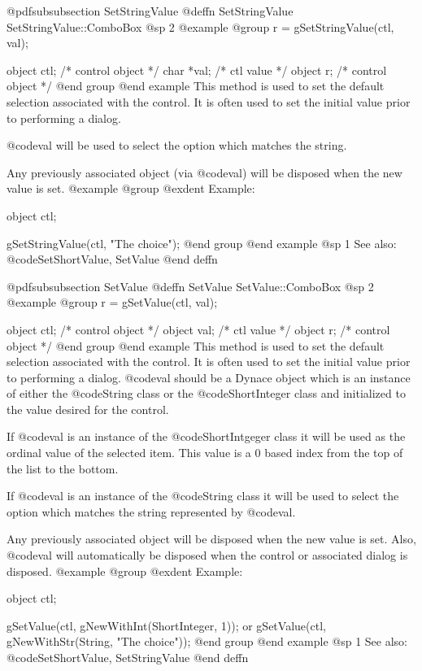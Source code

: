 @pdfsubsubsection {SetStringValue}
@deffn {SetStringValue} SetStringValue::ComboBox
@sp 2
@example
@group
r = gSetStringValue(ctl, val);

object  ctl;    /*  control object  */
char    *val;   /*  ctl value       */
object  r;      /*  control object  */
@end group
@end example
This method is used to set the default selection associated with the
control.  It is often used to set the initial value prior to performing
a dialog.  

@code{val} will be used to select the option which matches the string.

Any previously associated object (via @code{val}) will be disposed when
the new value is set.  
@example
@group
@exdent Example:

object  ctl;

gSetStringValue(ctl, "The choice");
@end group
@end example
@sp 1
See also:  @code{SetShortValue, SetValue}
@end deffn










@pdfsubsubsection {SetValue}
@deffn {SetValue} SetValue::ComboBox
@sp 2
@example
@group
r = gSetValue(ctl, val);

object  ctl;    /*  control object  */
object  val;    /*  ctl value       */
object  r;      /*  control object  */
@end group
@end example
This method is used to set the default selection associated with the
control.  It is often used to set the initial value prior to performing
a dialog.  @code{val} should be a Dynace object which is an instance of
either the @code{String} class or the @code{ShortInteger} class and
initialized to the value desired for the control.

If @code{val} is an instance of the @code{ShortIntgeger} class it will be
used as the ordinal value of the selected item.  This value is a 0 based
index from the top of the list to the bottom.

If @code{val} is an instance of the @code{String} class it will be used
to select the option which matches the string represented by @code{val}.

Any previously associated object will be disposed when the new value is set.
Also, @code{val} will automatically be disposed when the control or associated
dialog is disposed.
@example
@group
@exdent Example:

object  ctl;

gSetValue(ctl, gNewWithInt(ShortInteger, 1));
        or
gSetValue(ctl, gNewWithStr(String, "The choice"));
@end group
@end example
@sp 1
See also:  @code{SetShortValue, SetStringValue}
@end deffn













